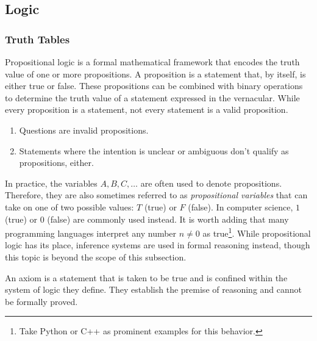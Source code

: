 \subsection{Logic}\label{subsec-logic}


\subsubsection{Truth Tables}\label{subsubsec-truth-table}

Propositional logic is a formal mathematical framework that encodes the truth value
of one or more propositions. A proposition is a statement that, by itself, is either
true or false. These propositions can be combined with binary operations to determine
the truth value of a statement expressed in the vernacular. While every proposition
is a statement, not every statement is a valid proposition.

\begin{enumerate}
	\item Questions are invalid propositions.
	\item Statements where the intention is unclear or ambiguous don't qualify as propositions, either.
\end{enumerate}

In practice, the variables \(A,B,C,\dots\) are often used to denote propositions.
Therefore, they are also sometimes referred to as \emph{propositional variables}
that can take on one of two possible values: \(T\) (true) or \(F\) (false). In
computer science, \(1\) (true) or \(0\) (false) are commonly used instead. It is
worth adding that many programming languages interpret any number \(n\neq0\) as
true\footnote{Take Python or C++ as prominent examples for this behavior.}. While
propositional logic has its place, inference systems are used in formal reasoning
instead, though this topic is beyond the scope of this subsection.

\begin{definition}\label{def-axiom}
	An axiom is a statement that is taken to be true and is confined within the
	system of logic they define. They establish the premise of reasoning and cannot
	be formally proved.
\end{definition}

